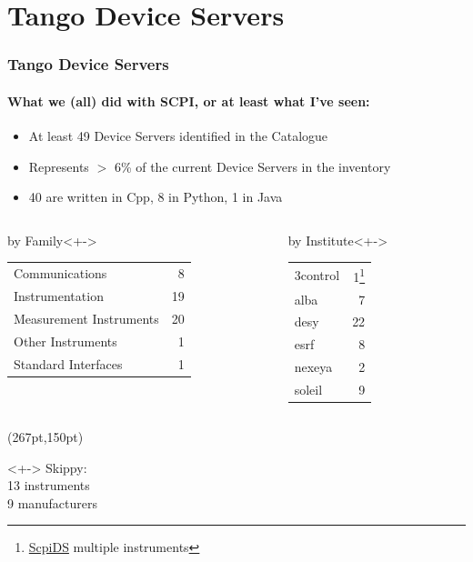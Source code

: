 \documentclass{beamer}
\begin{document}
\section{Tango Device Servers}

\begin{frame}
  \frametitle{Tango Device Servers}
  \framesubtitle{What we (all) did with SCPI, or at least what I've seen:}
  \begin{itemize}
    \item<+-> At least 49 Device Servers identified in the Catalogue
    \item<+-> Represents $>$ 6\% of the current Device Servers in the inventory
    \item<+-> 40 are written in Cpp, 8 in Python, 1 in Java
  \end{itemize}
  \begin{columns}
    \begin{column}{0.45\textwidth}
      \begin{exampleblock}{by Family}<+->
         \begin{tabular}{lr}
           Communications          &  8 \\
           Instrumentation         & 19 \\
           Measurement Instruments & 20 \\
           Other Instruments       &  1 \\
           Standard Interfaces     &  1 \\
         \end{tabular}
      \end{exampleblock}
    \end{column}
    \begin{column}{0.45\textwidth}
      \begin{exampleblock}{by Institute}<+->
          \begin{tabular}{lr}
            3control & 1\footnote{\href{https://www.tango-controls.org/developers/dsc/ds/1508/}{ScpiDS} multiple instruments} \\
            alba & 7 \\
            desy & 22 \\
            esrf & 8 \\
            nexeya & 2 \\
            soleil & 9 \\
          \end{tabular}
      \end{exampleblock}
    \end{column}
  \end{columns}
  \begin{textblock*}{80pt}(267pt,150pt)
    \begin{alertblock}{}<+->
      Skippy:\\
      13 instruments\\
      9 manufacturers
    \end{alertblock}
  \end{textblock*}
\end{frame}
\end{document}

